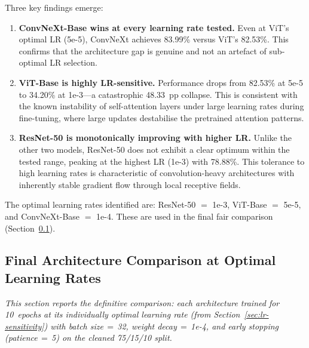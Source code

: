 Three key findings emerge:

\begin{enumerate}
  \item \textbf{ConvNeXt-Base wins at every learning rate tested.}
    Even at ViT's optimal LR (5e-5), ConvNeXt achieves 83.99\% versus
    ViT's 82.53\%.  This confirms that the architecture gap is genuine
    and not an artefact of sub-optimal LR selection.

  \item \textbf{ViT-Base is highly LR-sensitive.}  Performance drops
    from 82.53\% at 5e-5 to 34.20\% at 1e-3---a catastrophic
    48.33~pp collapse.  This is consistent with the known instability
    of self-attention layers under large learning rates during
    fine-tuning, where large updates destabilise the pretrained
    attention patterns.

  \item \textbf{ResNet-50 is monotonically improving with higher LR.}
    Unlike the other two models, ResNet-50 does not exhibit a clear
    optimum within the tested range, peaking at the highest LR (1e-3)
    with 78.88\%.  This tolerance to high learning rates is
    characteristic of convolution-heavy architectures with inherently
    stable gradient flow through local receptive fields.
\end{enumerate}

The optimal learning rates identified are: ResNet-50 $=$ 1e-3,
ViT-Base $=$ 5e-5, and ConvNeXt-Base $=$ 1e-4.  These are used in the
final fair comparison (Section~\ref{sec:final-comparison}).

\subsection{Final Architecture Comparison at Optimal Learning Rates}
\label{sec:final-comparison}

\textit{This section reports the definitive comparison: each
architecture trained for 10~epochs at its individually optimal learning
rate (from Section~\ref{sec:lr-sensitivity}) with batch size$\,{=}\,$32,
weight decay$\,{=}\,$1e-4, and early stopping (patience$\,{=}\,$5) on
the cleaned 75/15/10 split.}

